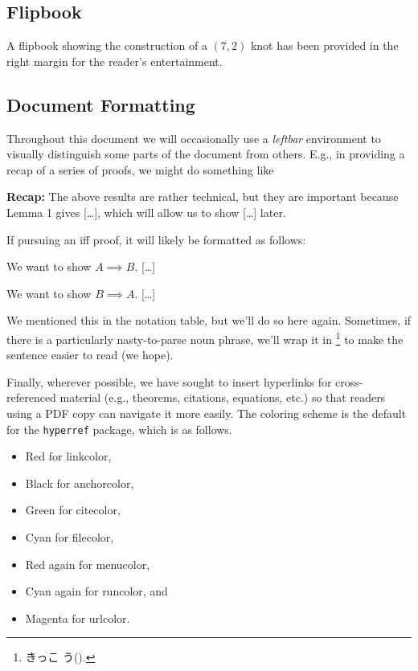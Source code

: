 
\subsection*{Flipbook}
A flipbook showing the construction of a $(7,2)$ knot has been
provided in the right margin for the reader's entertainment.


\subsection*{Document Formatting}\label{pref:formatting}
Throughout this document we will occasionally use a \emph{leftbar}
environment to visually distinguish some parts of the document from
others. E.g., in providing a recap of a series of proofs, we might do
something like
\begin{leftbar}
  \textbf{Recap:} The above results are rather technical, but they are
  important because Lemma 1 gives [\ldots], which will allow us to
  show [\ldots] later.
\end{leftbar}
If pursuing an iff proof, it will likely be formatted as follows:
\begin{iffproof}
  \item We want to show $A \implies B$. [\ldots]
  \item We want to show $B \implies A$. [\ldots]
\end{iffproof}
We mentioned this in the notation table, but we'll do so here again.
Sometimes, if there is a particularly nasty-to-parse noun phrase,
we'll wrap it in \footnote{きっこ
  う().} to make the sentence easier to
read (we hope).

Finally, wherever possible, we have sought to insert hyperlinks for
cross-referenced material (e.g., theorems, citations, equations, etc.)
so that readers using a PDF copy can navigate it more easily. The
coloring scheme is the default for the \texttt{hyperref} package,
which is as follows.
\begin{itemize}
  \item Red for {\color{red} linkcolor},
  \item Black for {\color{black} anchorcolor},
  \item Green for {\color{green} citecolor},
  \item Cyan for {\color{cyan} filecolor},
  \item Red again for {\color{red} menucolor},
  \item Cyan again for {\color{cyan} runcolor}, and
  \item Magenta for {\color{magenta} urlcolor}.
\end{itemize}




